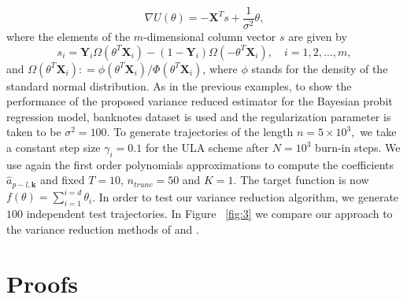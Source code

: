 \documentclass[bj]{imsart}
\begin{document}
\begin{equation*}
    \nabla U(\theta) = - \mathbf{X}^T s + \frac{1}{\sigma^2} \theta,
\end{equation*}
where the elements of the \(m\)-dimensional column vector $s$ are given by
\begin{equation*}
    s_i = \mathbf{Y}_i \Omega (\theta^T \mathbf{X}_i) - (1 - \mathbf{Y}_i) \Omega(- \theta^T \mathbf{X}_i), \quad i = 1, 2, \dots, m,
\end{equation*}
and $\Omega(\theta^T \mathbf{X}_i) : = \phi(\theta^T \mathbf{X}_i) / \Phi(\theta^T \mathbf{X}_i)$, where $\phi$ stands for the density of the standard normal distribution.
As in the previous examples, to show the performance  of the proposed variance reduced estimator for the Bayesian probit regression model, banknotes dataset is used and the regularization parameter is taken to be $\sigma^2=100$.
To generate trajectories of the length $n = 5 \times 10^3, $ we take a constant step size $\gamma_i = 0.1$ for the ULA scheme after $N = 10^3$ burn-in steps.  We use again the first order polynomials approximations to  compute the coefficients $\hat{a}_{p-l,\mathbf{k}}$ and fixed $T = 10$, $n_{trunc} = 50$ and $K=1$. The target function is now $f(\theta) = \sum_{i=1}^{i=d}\theta_i$.  In order to test our variance reduction algorithm, we generate \(100\) independent test trajectories. In Figure ~\ref{fig:3} we compare our approach to the variance reduction methods of \cite{mira2013zero} and \cite{brosse2018diffusion}.

\section{Proofs}
\label{sec:proofs}
\end{document}
